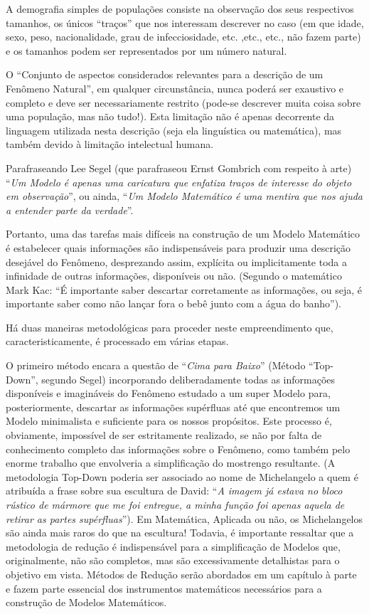     A demografia simples de populações consiste na observação dos seus respectivos tamanhos, os únicos ``traços'' que nos interessam descrever no caso (em que idade, sexo, peso, nacionalidade, grau de infecciosidade, etc. ,etc., etc., não fazem parte) e os tamanhos podem ser representados por um número natural.

    O ``Conjunto de aspectos considerados relevantes para a descrição de um Fenômeno Natural'', em qualquer circunstância, nunca poderá ser exaustivo e completo e deve ser necessariamente restrito (pode-se descrever muita coisa sobre uma população, mas não tudo!). Esta limitação não é apenas decorrente da linguagem utilizada nesta descrição (seja ela linguística ou matemática), mas também devido à limitação intelectual humana.

    Parafraseando Lee Segel (que parafraseou Ernst Gombrich com respeito à arte) ``\textit{Um Modelo é apenas uma caricatura que enfatiza traços de interesse do objeto em observação}'', ou ainda, ``\textit{Um Modelo Matemático é uma mentira que nos ajuda a entender parte da verdade}''.

    Portanto, uma das tarefas mais difíceis na construção de um Modelo Matemático é estabelecer quais informações são indispensáveis para produzir uma descrição desejável do Fenômeno, desprezando assim, explícita ou implicitamente toda a infinidade de outras informações, disponíveis ou não. (Segundo o matemático Mark Kac: ``É importante saber descartar corretamente as informações, ou seja, é importante saber como não lançar fora o bebê junto com a água do banho'').

    Há duas maneiras metodológicas para proceder neste empreendimento que, caracteristicamente, é processado em várias etapas.
    
    O primeiro método encara a questão de ``\textit{Cima para Baixo}'' (Método ``Top-Down'', segundo Segel) incorporando deliberadamente todas as informações disponíveis e imagináveis do Fenômeno estudado a um super Modelo para, posteriormente, descartar as informações supérfluas até que encontremos um Modelo minimalista e suficiente para os nossos propósitos. Este processo é, obviamente, impossível de ser estritamente realizado, se não por falta de conhecimento completo das informações sobre o Fenômeno, como também pelo enorme trabalho que envolveria a simplificação do mostrengo resultante. (A metodologia Top-Down poderia ser associado ao nome de Michelangelo a quem é atribuída a frase sobre sua escultura de David: ``\textit{A imagem já estava no bloco rústico de mármore que me foi entregue, a minha função foi apenas aquela de retirar as partes supérfluas}''). Em Matemática, Aplicada ou não, os Michelangelos são ainda mais raros do que na escultura! Todavia, é importante ressaltar que a metodologia de redução é indispensável para a simplificação de Modelos que, originalmente, não são completos, mas são excessivamente detalhistas para o objetivo em vista. Métodos de Redução serão abordados em um capítulo à parte e fazem parte essencial dos instrumentos matemáticos necessários para a construção de Modelos Matemáticos.

